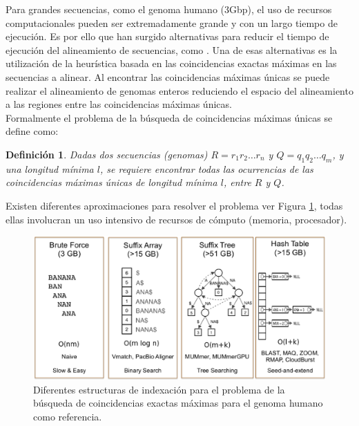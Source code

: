 \documentclass[12pt,a4paper]{article}
\newtheorem{mydef}{Definición}
\begin{document}
Para grandes secuencias, como el genoma humano (3Gbp), el uso de recursos computacionales pueden ser extremadamente grande y con un largo tiempo de ejecución. Es por ello que han surgido alternativas para reducir el tiempo de ejecución del alineamiento de secuencias, como \cite{OguzhanKulekci2011,Mongelli,Kouzinopoulos2005,Encarnac2011,Vyverman2013,OguzhanKulekci2011,Khan2009,OhlebuschGK10}. Una de esas alternativas es la utilización de la heurística basada en las coincidencias exactas máximas en las secuencias a alinear. Al encontrar las coincidencias máximas  únicas se puede realizar el alineamiento de genomas enteros reduciendo el espacio del alineamiento a las regiones entre las coincidencias máximas únicas.\\
\indent
Formalmente el problema de la búsqueda de coincidencias máximas únicas se define como:
\begin{mydef}
  Dadas dos secuencias (genomas) $R=r_{1}r_{2}\hdots r_{n}$ y $Q=q_{1}q_{2}\hdots q_{m}$, y una longitud mínima $l$, se requiere encontrar todas las ocurrencias de las coincidencias máximas únicas de longitud mínima $l$, entre $R$ y $Q$.
\end{mydef}
Existen diferentes aproximaciones para resolver el problema ver Figura \ref{fig:state}, todas ellas involucran un uso intensivo de recursos de cómputo (memoria, procesador).
\begin{figure}[h] 
   \centering 
   \includegraphics[scale=0.3]{state.eps} 
   \caption{Diferentes estructuras de indexación para el problema de la búsqueda de coincidencias exactas máximas para el genoma humano como referencia.} 
   \label{fig:state} 
 \end{figure}
\indent
\end{document}
